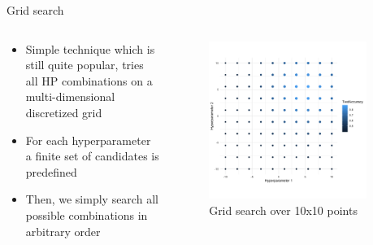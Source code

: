 
\subtitle{Tuning Algorithms}




\maketitle




\begin{frame}{Grid search}

\begin{columns}
\begin{column}{0.49\textwidth}
\begin{itemize}
\item Simple technique which is still quite popular, tries all
HP combinations on a multi-dimensional discretized grid
\item For each hyperparameter a finite set of candidates is predefined
\item Then, we simply search all possible combinations in arbitrary order
\end{itemize}
\end{column}
\begin{column}{0.49\textwidth}
\vspace*{-0.8cm}
\begin{center}
\begin{figure}
\includegraphics[width=0.9\textwidth]{images/grid.png}
\caption*{Grid search over 10x10 points}
\end{figure}
\end{center}
\end{column}
\end{columns}


\end{frame}
